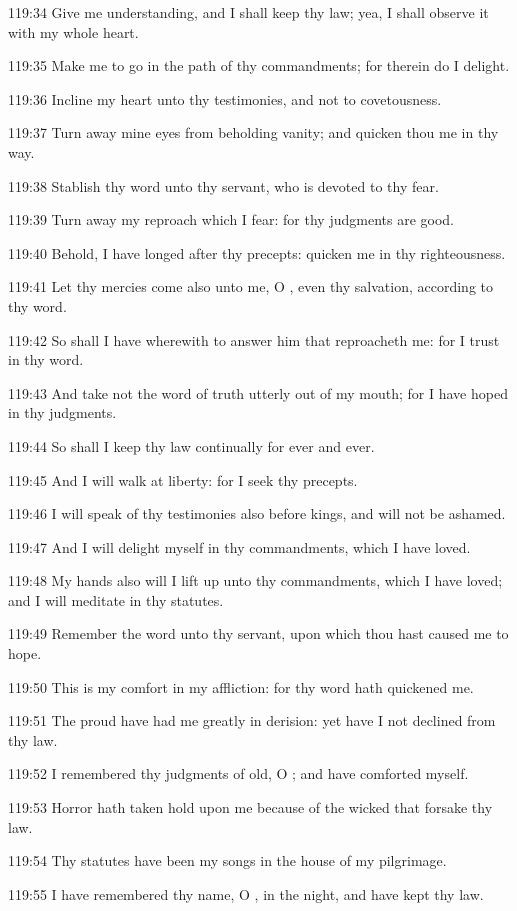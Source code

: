 119:34 Give me understanding, and I shall keep thy law; yea, I shall observe it with my whole heart.

119:35 Make me to go in the path of thy commandments; for therein do I delight.

119:36 Incline my heart unto thy testimonies, and not to covetousness.

119:37 Turn away mine eyes from beholding vanity; and quicken thou me in thy way.

119:38 Stablish thy word unto thy servant, who is devoted to thy fear.

119:39 Turn away my reproach which I fear: for thy judgments are good.

119:40 Behold, I have longed after thy precepts: quicken me in thy righteousness.

119:41 Let thy mercies come also unto me, O \LORD, even thy salvation, according to thy word.

119:42 So shall I have wherewith to answer him that reproacheth me: for I trust in thy word.

119:43 And take not the word of truth utterly out of my mouth; for I have hoped in thy judgments.

119:44 So shall I keep thy law continually for ever and ever.

119:45 And I will walk at liberty: for I seek thy precepts.

119:46 I will speak of thy testimonies also before kings, and will not be ashamed.

119:47 And I will delight myself in thy commandments, which I have loved.

119:48 My hands also will I lift up unto thy commandments, which I have loved; and I will meditate in thy statutes.

119:49 Remember the word unto thy servant, upon which thou hast caused me to hope.

119:50 This is my comfort in my affliction: for thy word hath quickened me.

119:51 The proud have had me greatly in derision: yet have I not declined from thy law.

119:52 I remembered thy judgments of old, O \LORD; and have comforted myself.

119:53 Horror hath taken hold upon me because of the wicked that forsake thy law.

119:54 Thy statutes have been my songs in the house of my pilgrimage.

119:55 I have remembered thy name, O \LORD, in the night, and have kept thy law.

